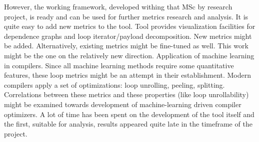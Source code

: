 \null\qquad However, the working framework, developed withing that  MSc by research project, is ready and can be used for further metrics research and analysis. It is quite easy to add new metrics to the tool. Tool provides visualization facilities for dependence graphs and loop iterator/payload decomposition. New metrics might be added. Alternatively, existing metrics might be fine-tuned as well. This work might be the one on the relatively new direction. Application of machine learning in compilers. Since all machine learning methods require some quantitative features, these loop metrics might be an attempt in their establishment. Modern compilers apply a set of optimizations: loop unrolling, peeling, splitting. Correlations between these metrics and these properties (like loop unrollability) might be examined towards development of machine-learning driven compiler optimizers.\newline
\null\qquad A lot of time has been spent on the development of the tool itself and the first, suitable for analysis, results appeared quite late in the timeframe of the project.         